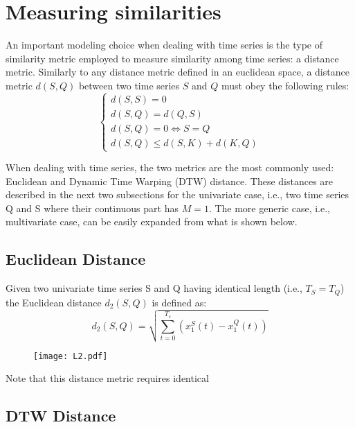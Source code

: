\section{Measuring similarities}
\label{sec:similarities}

An important modeling choice when dealing with time series is the type of similarity 
metric employed to measure similarity among time series: a distance metric. 
Similarly to any distance metric defined in an euclidean space, 
a distance metric $d(S,Q)$ between two time series $S$ and $Q$ must obey the following rules:
\begin{equation}
  \begin{cases}
    d(S,S) = 0 \\
    d(S,Q) = d(Q,S) \\ 
    d(S,Q) = 0  \Longleftrightarrow  S=Q \\ 
    d(S,Q) \leq d(S,K) + d(K,Q) 
  \end{cases}
  \label{eq:distanceRules}
\end{equation}

When dealing with time series, the two metrics are the most commonly used: Euclidean and 
Dynamic Time Warping (DTW) distance. These distances are described in the next two subsections for
the univariate case, i.e., two time series Q and S where their continuous part has $M=1$. 
The more generic case, i.e., multivariate case, can be easily expanded from what is shown below.

\subsection{Euclidean Distance}
\label{sec:euclidean}

Given two univariate time series S and Q having identical length (i.e., $T_S=T_Q$) the Euclidean 
distance $d_2(S,Q)$ is defined as:
\begin{equation}
  d_2(S,Q) = \sqrt{ \sum_{t=0}^{T_s} (x_1^S(t)-x_1^Q(t))}
  \label{eq:euclidean}
\end{equation}

\begin{figure}
    \centering
    \texttt{[image: L2.pdf]}
    \caption{}
    \label{fig:2Danalogy}
\end{figure} 

Note that this distance metric requires identical 

\subsection{DTW Distance}
\label{sec:dtw}


